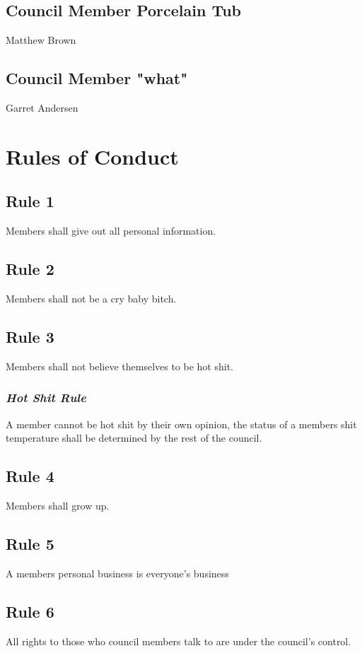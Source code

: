 \documentclass[]{article}
\begin{document}
	\subsection{Council Member Porcelain Tub}
	\label{subsec:matt}
		Matthew Brown
	\subsection{Council Member "what"}
	\label{subsec:gary}
		Garret Andersen

\newpage
\section{Rules of Conduct}
\label{sec:rulesConduct}

\subsection{Rule 1}
Members shall give out all personal information.

\subsection{Rule 2}
Members shall not be a cry baby bitch.

\subsection{Rule 3}
Members shall not believe themselves to be hot shit.
\subsubsection{\textit{Hot Shit Rule}}
A member cannot be hot shit by their own opinion, the status of a members shit temperature shall be determined by the rest of the council.

\subsection{Rule 4}
Members shall grow up.

\subsection{Rule 5}
A members personal business is everyone's business

\subsection{Rule 6}
All rights to those who council members talk to are under the council's control.
\end{document}
